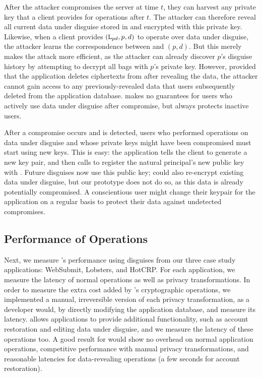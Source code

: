%
After the attacker compromises the server at time $t$, they can harvest any
private key that a client provides for operations after $t$.
%
The attacker can therefore reveal all current data under disguise stored in \sys and
encrypted with this private key.
%
Likewise, when a client provides $(\texttt{L}_{pd}, p, d)$ to operate over data under
disguise, the attacker learns the correspondence between  and $(p, d)$.
%
But this merely makes the attack more efficient, as the attacker can already discover
$p$'s disguise history by attempting to decrypt all bags with $p$'s private key.
%
However, provided that the application deletes ciphertexts from \sys after revealing
the data, the attacker cannot gain access to any previously-revealed data that users
subsequently deleted from the application database.
%
\sys makes no guarantees for users who actively use data under disguise after
compromise, but always protects inactive users.
%

%
After a compromise occurs and is detected, users who performed operations on data
under disguise and whose private keys might have been compromised must start using new
keys.
%
This is easy: the application tells the client to generate a new key pair, and then
calls  to register the natural principal's new public key with
\sys.
%
Future disguises now use this public key; \sys could also re-encrypt existing data
under disguise, but our prototype does not do so, as this data is already potentially
compromised.
%
A conscientious user might change their keypair for the application on a regular basis
to protect their data against undetected compromises.
%

\subsection{Performance of \sys Operations}
\label{s:eval-ops}

%
Next, we measure \sys's performance using disguises from our three case study
applications: WebSubmit, Lobsters, and HotCRP.
%
For each application, we measure the latency of normal operations as well as
privacy transformations.
%
In order to measure the extra cost added by \sys's cryptographic operations,
we implemented a manual, irreversible version of each privacy transformation,
as a developer would, by directly modifying the application database, and
measure its latency.
%
\sys allows applications to provide additional functionality, such as account
restoration and editing data under disguise, and we measure the latency of these
operations too.
%
A good result for \sys would show no overhead on normal application operations,
competitive performance with manual privacy transformations, and reasonable
latencies for data-revealing operations (\eg a few seconds for account
restoration).
%


